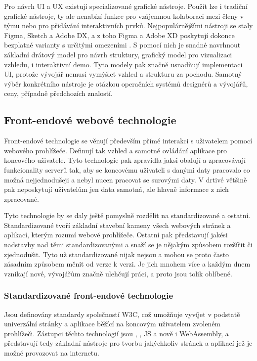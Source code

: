 	Pro návrh \ac{UI} a \ac{UX} existují specializované grafické nástroje.
	Použít lze i tradiční grafické nástroje, ty ale nenabízí funkce pro vzájemnou kolaboraci mezi
	členy v týmu nebo pro přidávání interaktivních prvků.
	Nejpopulárnějšími nástroji se staly Figma, Sketch a Adobe DX, a z toho Figma a Adobe XD poskytují dokonce bezplatné
	varianty s určitými omezeními \cite{design_tools_database}.
	S pomocí nich je snadné navrhnout základní drátový model pro návrh struktury, grafický model pro vizualizaci
	vzhledu, i interaktivní demo.
	Tyto modely pak značně usnadňují implementaci \ac{UI}, protože vývojář nemusí vymýšlet
	vzhled a strukturu za pochodu.
	Samotný výběr konkrétního nástroje je otázkou operačních systémů designérů a vývojářů, ceny, případně
	předchozích znalostí.

	\subsection{Front-endové webové technologie}

	Front-endové technologie se věnují především přímé interakci s uživatelem pomocí webového prohlížeče.
	Definují tak vzhled a samotné ovládání aplikace pro koncového uživatele.
	Tyto technologie pak zpravidla jaksi obalují a zpracovávají funkcionality serverů tak, aby se koncovému uživateli s danými
	daty pracovalo co možná nejjednodušeji a nebyl nucen pracovat se surovými daty.
	V drtivé většině pak neposkytují uživatelům jen data samotná, ale hlavně informace z nich zpracované.

	Tyto technologie by se daly ještě pomyslně rozdělit na standardizované a ostatní.
	Standardizované tvoří základní stavební kameny všech webových stránek a aplikací, kterým rozumí webové
	prohlížeče.
	Ostatní pak představují jakési nadstavby nad těmi standardizovanými a snaží se je nějakým způsobem rozšířit
	či zjednodušit.
	Tyto už standardizované nijak nejsou a mohou se proto často zásadním způsobem měnit od verze k verzi.
	Je jich mnohem více a každým dnem vznikají nové, vývojářům značně ulehčují práci, a proto jsou tolik oblíbené.

		\subsubsection{Standardizované front-endové technologie}

		Jsou definovány standardy společností W3C, což umožňuje vyvíjet v podstatě univerzální stránky a aplikace běžící na
		koncovým uživatelem zvoleném prohlížeči.
		Zástupci těchto technologií jsou , , \ac{JS} a nově i WebAssembly, a představují tedy základní
		nástroje pro tvorbu jakýchkoliv stránek a aplikací jež je možné provozovat na internetu. \cite{w3c_webdesign}

